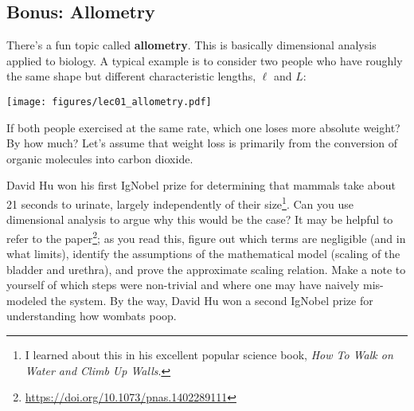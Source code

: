 

\subsection{Bonus: Allometry}

There’s a fun topic called \textbf{allometry}. This is basically dimensional analysis applied to biology. A typical example is to consider two people who have roughly the same shape but different characteristic lengths, $\ell$ and $L$:

\begin{center}
\texttt{[image: figures/lec01\_allometry.pdf]}
\end{center}

\begin{exercise}
If both people exercised at the same rate, which one loses more absolute weight? By how much? Let’s assume that weight loss is primarily from the conversion of organic molecules into carbon dioxide. 
\end{exercise}


\begin{exercise}
David Hu won his first IgNobel prize for determining that mammals take about 21 seconds to urinate, largely independently of their size\footnote{I learned about this in his excellent popular science book, \emph{How To Walk on Water and Climb Up Walls}.}. Can you use dimensional analysis to argue why this would be the case? It may be helpful to refer to the paper\footnote{\url{https://doi.org/10.1073/pnas.1402289111}}; as you read this, figure out which terms are negligible (and in what limits), identify the assumptions of the mathematical model (scaling of the bladder and urethra), and prove the approximate scaling relation. Make a note to yourself of which steps were non-trivial and where one may have naively mis-modeled the system. By the way, David Hu won a second IgNobel prize for understanding how wombats poop.
\end{exercise}

